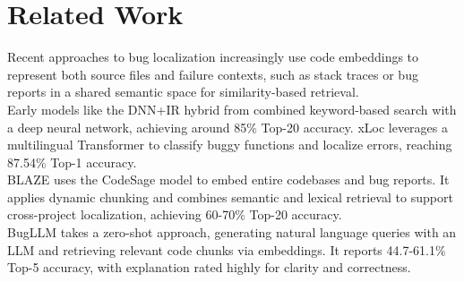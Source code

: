 \section{Related Work}
Recent approaches to bug localization increasingly use code embeddings to represent both source files and failure contexts, such as stack traces or bug reports in a shared semantic space for similarity-based retrieval.\\
Early models like the DNN+IR hybrid from \citet{7961519} combined keyword-based search with a deep neural network, achieving around 85\% Top-20 accuracy. xLoc \citep{yang2024xloc} leverages a multilingual Transformer to classify buggy functions and localize errors, reaching 87.54\% Top-1 accuracy.\\
BLAZE \citep{blaze2024} uses the CodeSage model \citet{zhang2024coderepresentationlearningscale} to embed entire codebases and bug reports. It applies dynamic chunking and combines semantic and lexical retrieval to support cross-project localization, achieving 60-70\% Top-20 accuracy.\\
BugLLM \citep{subramanian2024bugllm} takes a zero-shot approach, generating natural language queries with an LLM and retrieving relevant code chunks via embeddings. It reports 44.7-61.1\% Top-5 accuracy, with explanation rated highly for clarity and correctness.